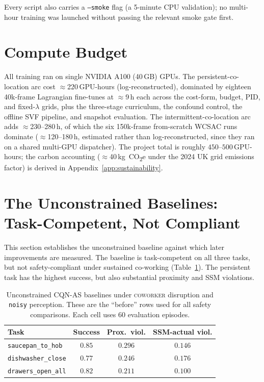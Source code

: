 \documentclass[11pt,a4paper]{report}
\newcommand{\ssm}{SSM}
\newcommand{\cqnas}{CQN-AS}
\newcommand{\coworker}{\textsc{coworker}}
\begin{document}
\label{sec:setup:smoke}%
Every script also carries a \texttt{--smoke} flag (a 5-minute CPU
validation); no multi-hour training was launched without passing the
relevant smoke gate first.

\section{Compute Budget}
\label{sec:setup:compute}

All training ran on single NVIDIA A100 (40\,GB) GPUs. The
persistent-co-location arc cost $\approx$220\,GPU-hours
(log-reconstructed), dominated by eighteen 40k-frame Lagrangian
fine-tunes at $\approx$9\,h each across the cost-form, budget, PID,
and fixed-$\lambda$ grids, plus the three-stage curriculum, the
confound control, the offline SVF pipeline, and snapshot evaluation.
The intermittent-co-location arc adds $\approx$230--280\,h, of which
the six 150k-frame from-scratch WCSAC runs dominate
($\approx$120--180\,h, estimated rather than log-reconstructed,
since they ran on a shared multi-GPU dispatcher). The project total
is roughly $450$--$500$\,GPU-hours; the carbon accounting
($\approx$40\,kg~CO\textsubscript{2}e under the 2024 UK grid
emissions factor) is derived in Appendix~\ref{app:sustainability}.


\section{The Unconstrained Baselines: Task-Competent, Not Compliant}
\label{sec:results:baseline}

This section establishes the unconstrained baseline against which later
improvements are measured. The baseline is task-competent on all three
tasks, but not safety-compliant under sustained co-working
(Table~\ref{tab:results:baseline}). The persistent task has the
highest success, but also substantial proximity and \ssm{} violations.

\begin{table}[htbp]
\centering
\caption{Unconstrained \cqnas{} baselines under \coworker{} disruption
and \texttt{noisy} perception. These are the ``before'' rows used for
all safety comparisons. Each cell uses 60 evaluation episodes.}
\label{tab:results:baseline}
\small
\begin{tabular}{lccc}
\toprule
Task & Success & Prox.\ viol. & \ssm{}-actual viol. \\
\midrule
\texttt{saucepan\_to\_hob}      & $0.85$ & $0.296$ & $0.146$ \\
\texttt{dishwasher\_close}      & $0.77$ & $0.246$ & $0.176$ \\
\texttt{drawers\_open\_all}     & $0.82$ & $0.211$ & $0.100$ \\
\bottomrule
\end{tabular}
\end{table}
\end{document}

